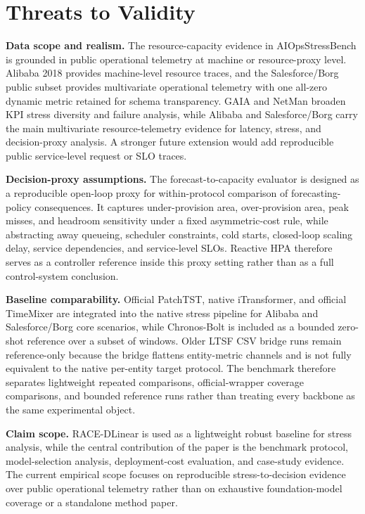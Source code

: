 \documentclass[conference]{IEEEtran}
\begin{document}
\section{Threats to Validity}

\noindent\textbf{Data scope and realism.}
The resource-capacity evidence in AIOpsStressBench is grounded in public operational telemetry at machine or resource-proxy level. Alibaba 2018 provides machine-level resource traces, and the Salesforce/Borg public subset provides multivariate operational telemetry with one all-zero dynamic metric retained for schema transparency. GAIA and NetMan broaden KPI stress diversity and failure analysis, while Alibaba and Salesforce/Borg carry the main multivariate resource-telemetry evidence for latency, stress, and decision-proxy analysis. A stronger future extension would add reproducible public service-level request or SLO traces.

\noindent\textbf{Decision-proxy assumptions.}
The forecast-to-capacity evaluator is designed as a reproducible open-loop proxy for within-protocol comparison of forecasting-policy consequences. It captures under-provision area, over-provision area, peak misses, and headroom sensitivity under a fixed asymmetric-cost rule, while abstracting away queueing, scheduler constraints, cold starts, closed-loop scaling delay, service dependencies, and service-level SLOs. Reactive HPA therefore serves as a controller reference inside this proxy setting rather than as a full control-system conclusion.

\noindent\textbf{Baseline comparability.}
Official PatchTST, native iTransformer, and official TimeMixer are integrated into the native stress pipeline for Alibaba and Salesforce/Borg core scenarios, while Chronos-Bolt is included as a bounded zero-shot reference over a subset of windows. Older LTSF CSV bridge runs remain reference-only because the bridge flattens entity-metric channels and is not fully equivalent to the native per-entity target protocol. The benchmark therefore separates lightweight repeated comparisons, official-wrapper coverage comparisons, and bounded reference runs rather than treating every backbone as the same experimental object.

\noindent\textbf{Claim scope.}
RACE-DLinear is used as a lightweight robust baseline for stress analysis, while the central contribution of the paper is the benchmark protocol, model-selection analysis, deployment-cost evaluation, and case-study evidence. The current empirical scope focuses on reproducible stress-to-decision evidence over public operational telemetry rather than on exhaustive foundation-model coverage or a standalone method paper.
\end{document}
